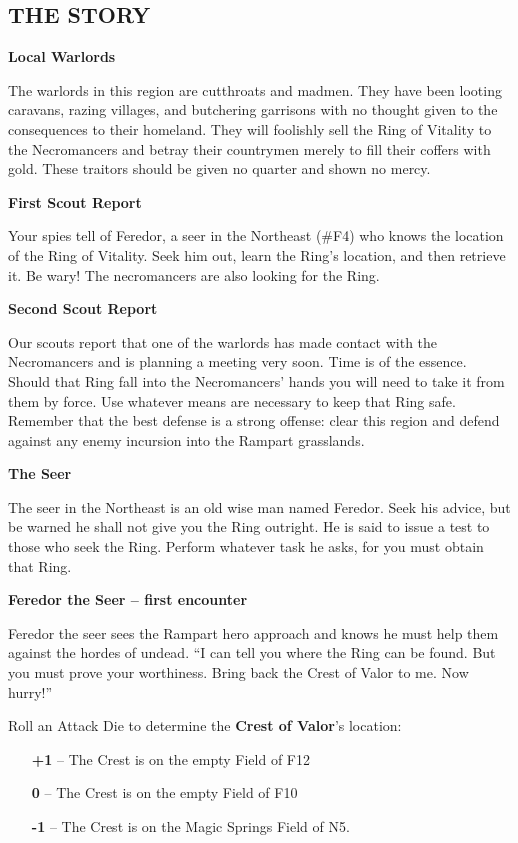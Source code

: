 \begin{multicols*}{2}

\subsection*{\MakeUppercase{The Story}}

\textbf{Local Warlords}

The warlords in this region are cutthroats and madmen.
They have been looting caravans, razing villages, and butchering garrisons with no thought given to the consequences to their homeland.
They will foolishly sell the Ring of Vitality to the Necromancers and betray their countrymen merely to fill their coffers with gold.
These traitors should be given no quarter and shown no mercy.

\textbf{First Scout Report}

Your spies tell of Feredor, a seer in the Northeast (\#F4) who knows the location of the Ring of Vitality.
Seek him out, learn the Ring's location, and then retrieve it.
Be wary!
The necromancers are also looking for the Ring.

\textbf{Second Scout Report}

Our scouts report that one of the warlords has made contact with the Necromancers and is planning a meeting very soon.
Time is of the essence.
Should that Ring fall into the Necromancers' hands you will need to take it from them by force.
Use whatever means are necessary to keep that Ring safe.
Remember that the best defense is a strong offense: clear this region and defend against any enemy incursion into the Rampart grasslands.

\textbf{The Seer}

The seer in the Northeast is an old wise man named Feredor.
Seek his advice, but be warned he shall not give you the Ring outright.
He is said to issue a test to those who seek the Ring.
Perform whatever task he asks, for you must obtain that Ring.

\textbf{Feredor the Seer -- first encounter}

  Feredor the seer sees the Rampart hero approach and knows he must help them against the hordes of undead.  %
``I can tell you where the Ring can be found.
But you must prove your worthiness.
Bring back the Crest of Valor to me. Now hurry!''

\textcolor{darkcandyapplered}{Roll an Attack Die to determine the \textbf{Crest of Valor}'s location:}
\begin{itemize}
  \item[\textbf{+1}] -- The Crest is on the empty Field of F12
  \item[\textbf{0}] -- The Crest is on the empty Field of F10
  \item[\textbf{-1}] -- The Crest is on the Magic Springs Field of N5.
\end{itemize}


\end{multicols*}
